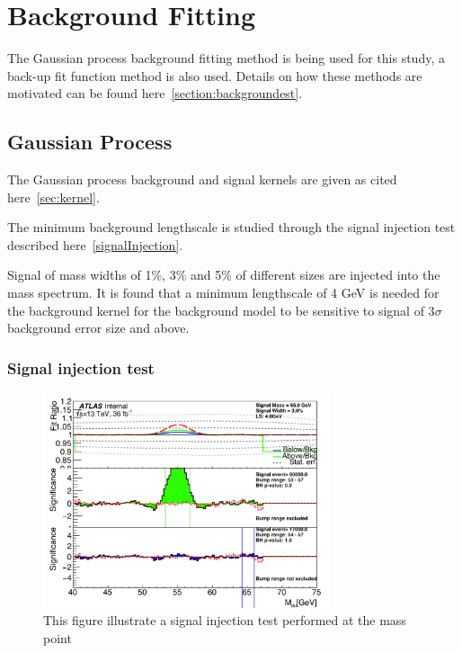 \section{Background Fitting}

The Gaussian process background fitting method is being used for this study, a back-up fit function method is also used. Details on how these methods are motivated can be found here~\ref{section:backgroundest}.  

\subsection{Gaussian Process}

The Gaussian process background and signal kernels are given as cited here~\ref{sec:kernel}.

The minimum background lengthscale is studied through the signal injection test described here~\ref{signalInjection}.

Signal of mass widths of 1\%, 3\% and 5\% of different sizes are injected into the mass spectrum. It is found that a minimum lengthscale of 4 GeV is needed for the background kernel for the background model to be sensitive to signal of 3$\sigma$ background error size and above.


\subsubsection{Signal injection test}
\begin{figure}[!htb]
    \begin{center}
        \includegraphics[width=0.75\textwidth]{figures/chapter_dimuon/signalInjection}        
        \caption{
        This figure illustrate a signal injection test performed at the mass point  }
            \label{fig:dimuonstudies}
    \end{center}
\end{figure}

